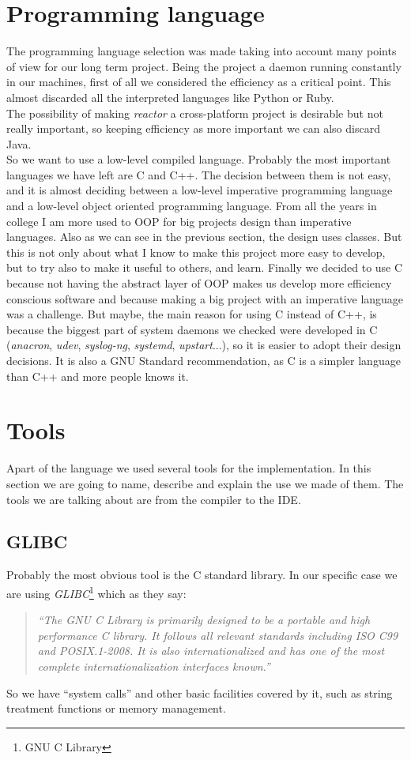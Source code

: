 \section{Programming language}
The programming language selection was made taking into account many points of view for our long term project. Being the project a 
daemon running constantly in our machines, first of all we considered the efficiency as a critical point. This almost discarded all the 
interpreted languages like Python or Ruby.\\
The possibility of making \emph{reactor} a cross-platform project is desirable but not really important, so keeping efficiency as more 
important we can also discard Java.\\
So we want to use a low-level compiled language. Probably the most important languages we have left are C and C++. The decision between
them is not easy, and it is almost deciding between a low-level imperative programming language and a low-level object oriented programming 
language. From all the years in college I am more used to OOP for big projects design than imperative languages. Also as we can see in the
previous section, the design uses classes. But this is not only about what I know to make this project more easy to develop, but to try 
also to make it useful to others, and learn. Finally we decided to use C because not having the abstract layer of OOP makes us develop
more efficiency conscious software and because making a big project with an imperative language was a challenge. But maybe, the main reason
for using C instead of C++, is because the biggest part of system daemons we checked were developed in C (\emph{anacron}, \emph{udev},
\emph{syslog-ng}, \emph{systemd}, \emph{upstart}...), so it is easier to adopt their design decisions. It is also a GNU Standard 
recommendation, as C is a simpler language than C++ and more people knows it\cite{gnu:lang}.
\section{Tools}
Apart of the language we used several tools for the implementation. In this section we are going to name, describe and explain
the use we made of them. The tools we are talking about are from the compiler to the IDE.\\
\subsection{GLIBC}
Probably the most obvious tool is the C standard library. In our specific case we are using \emph{GLIBC}\footnote{GNU C Library} which as 
they say\cite{gnu:glibc}:
\begin{quote}
  \emph{``The GNU C Library is primarily designed to be a portable and high performance C library. It follows all relevant standards 
	  including ISO C99 and POSIX.1-2008. It is also internationalized and has one of the most complete internationalization 
	  interfaces known.''}
\end{quote}
So we have ``system calls'' and other basic facilities covered by it, such as string treatment functions or memory management.
